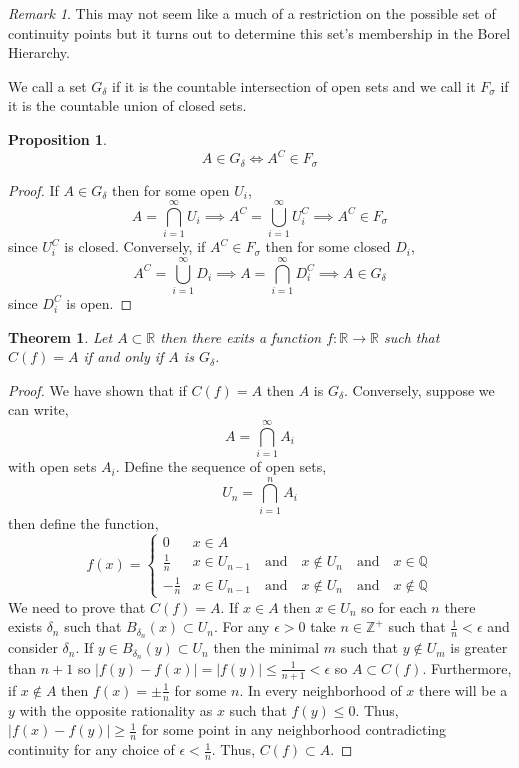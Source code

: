 \documentclass{article}
\newcommand{\Zplus}{\mathbb{Z}^{+}}
\newcommand{\ball}[2]{B_{#1} \! \left(#2 \right)}
\newcommand{\Q}{\mathbb{Q}}
\newcommand{\R}{\mathbb{R}}
\newenvironment{definition}[1][Definition:]{\begin{trivlist}
\item[\hskip \labelsep {\bfseries #1}]}{\end{trivlist}}
\theoremstyle{theorem}
\newtheorem{theorem}{Theorem}[section]
\theoremstyle{definition}
\theoremstyle{definition}
\newtheorem*{proposition}{Proposition}
\theoremstyle{remark}
\theoremstyle{definition}
\theoremstyle{remark}
\newtheorem{remark}{Remark}[subsection]
\begin{document}
\begin{remark}
This may not seem like a much of a restriction on the possible set of continuity points but it turns out to determine this set's membership in the Borel Hierarchy. 
\end{remark}

\begin{definition}
We call a set $G_{\delta}$ if it is the countable intersection of open sets and we call it $F_{\sigma}$ if it is the countable union of closed sets.  
\end{definition}

\begin{proposition}
\[ A \in G_{\delta} \iff A^C \in F_{\sigma} \]
\end{proposition}

\begin{proof}
If $A \in G_{\delta}$ then for some open $U_i$,
\[ A = \bigcap_{i = 1}^{\infty} U_i \implies A^C = \bigcup_{i = 1}^{\infty} U_i^C \implies A^C \in F_{\sigma} \]
since $U_i^C$ is closed. Conversely, if $A^C \in F_{\sigma}$ then for some closed $D_i$,
\[ A^C = \bigcup_{i = 1}^\infty D_i \implies A = \bigcap_{i = 1}^\infty D_i^C \implies A \in G_{\delta} \]
since $D_i^C$ is open. 
\end{proof}

\begin{theorem}
Let $A \subset \R$ then there exits a function $f : \R \to \R$ such that $C(f) = A$ if and only if $A$ is $G_{\delta}$. 
\end{theorem}

\begin{proof}
We have shown that if $C(f) = A$ then $A$ is $G_{\delta}$. Conversely, suppose we can write,
\[ A = \bigcap_{i = 1}^{\infty} A_i \]
with open sets $A_i$. Define the sequence of open sets,
\[ U_n = \bigcap_{i = 1}^n A_i \]
then define the function,
\[ f(x) 
= 
\begin{cases}
0 & x \in A
\\
\frac{1}{n} & x \in U_{n-1} \quad \text{and} \quad x \notin U_{n} \quad \text{and} \quad x \in \Q
\\
- \frac{1}{n} & x \in U_{n-1} \quad \text{and} \quad x \notin U_{n} \quad \text{and} \quad x \notin \Q
\end{cases} \]
We need to prove that $C(f) = A$. If $x \in A$ then $x \in U_n$ so for each $n$ there exists $\delta_n$ such that $\ball{\delta_n}{x} \subset U_n$. For any $\epsilon > 0$ take $n \in \Zplus$ such that $\frac{1}{n} < \epsilon$ and consider $\delta_n$. If $y \in \ball{\delta_n}{y} \subset U_n$ then the minimal $m$ such that $y \notin U_m$ is greater than $n + 1$ so $|f(y) - f(x)| = |f(y)| \le \frac{1}{n + 1} < \epsilon$ so $A \subset C(f)$. Furthermore, if $x \notin A$ then $f(x) = \pm \frac{1}{n}$ for some $n$. In every neighborhood of $x$ there will be a $y$ with the opposite rationality as $x$ such that $f(y) \le 0$. Thus, $|f(x) - f(y)| \ge \frac{1}{n}$ for some point in any neighborhood contradicting continuity for any choice of $\epsilon < \frac{1}{n}$. Thus, $C(f) \subset A$. 
\end{proof}
\end{document}
